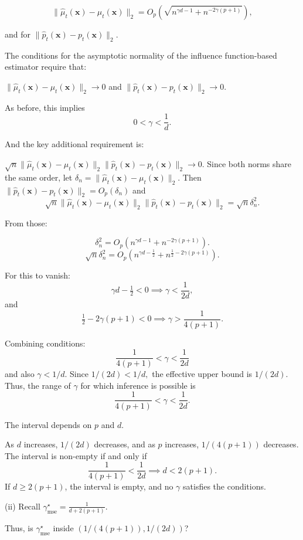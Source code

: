 \documentclass{article}
\begin{document}
\[
\|\hat{\mu}_t(\mathbf{x}) - \mu_t(\mathbf{x})\|_2 = O_p\left(\sqrt{n^{\gamma d - 1} + n^{-2\gamma(p+1)}}\right),
\]

and for \(\|\hat{p}_t(\mathbf{x}) - p_t(\mathbf{x})\|_2\).

The conditions for the asymptotic normality of the influence function-based estimator require that:

\(\|\hat{\mu}_t(\mathbf{x}) - \mu_t(\mathbf{x})\|_2 \to 0\) and \(\|\hat{p}_t(\mathbf{x}) - p_t(\mathbf{x})\|_2 \to 0\).

As before, this implies
\[
0 < \gamma < \frac{1}{d}.
\]

And the key additional requirement is:

\(\sqrt{n}\|\hat{\mu}_t(\mathbf{x}) - \mu_t(\mathbf{x})\|_2 \|\hat{p}_t(\mathbf{x}) - p_t(\mathbf{x})\|_2 \to 0.\) Since both norms share the same order, let \(\delta_n = \|\hat{\mu}_t(\mathbf{x}) - \mu_t(\mathbf{x})\|_2\). Then \(\|\hat{p}_t(\mathbf{x}) - p_t(\mathbf{x})\|_2 = O_p(\delta_n)\) and
\[
\sqrt{n}\|\hat{\mu}_t(\mathbf{x}) - \mu_t(\mathbf{x})\|_2 \|\hat{p}_t(\mathbf{x}) - p_t(\mathbf{x})\|_2 = \sqrt{n}\delta_n^2.
\]

From those:

\[
\delta_n^2 = O_p(n^{\gamma d - 1} + n^{-2\gamma(p+1)}).
\]
\[
\sqrt{n}\delta_n^2 = O_p(n^{\gamma d - \tfrac{1}{2}} + n^{\tfrac{1}{2} - 2\gamma(p+1)}).
\]

For this to vanish:
\[
\gamma d - \tfrac{1}{2} < 0 \implies \gamma < \frac{1}{2d},
\]
and
\[
\tfrac{1}{2} - 2\gamma(p+1) < 0 \implies \gamma > \frac{1}{4(p+1)}.
\]

Combining conditions:
\[
\frac{1}{4(p+1)} < \gamma < \frac{1}{2d}
\]
and also \(\gamma < 1/d\). Since \(1/(2d) < 1/d,\) the effective upper bound is \(1/(2d).\) Thus, the range of \(\gamma\) for which inference is possible is
\[
\frac{1}{4(p+1)} < \gamma < \frac{1}{2d}.
\]

The interval depends on \(p\) and \(d\).

As \(d\) increases, \(1/(2d)\) decreases, and as \(p\) increases, \(1/(4(p+1))\) decreases. The interval is non-empty if and only if
\[
\frac{1}{4(p+1)} < \frac{1}{2d} \implies d < 2(p+1).
\]
If \(d \ge 2(p+1)\), the interval is empty, and no \(\gamma\) satisfies the conditions.

(ii) Recall \( \gamma^\star_{\text{mse}} = \frac{1}{d+2(p+1)} \).

Thus, is \(\gamma^\star_{\text{mse}}\) inside \((1/(4(p+1)), 1/(2d))\)?
\end{document}
